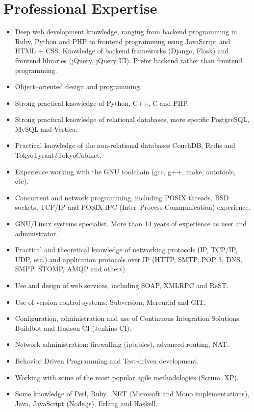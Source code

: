 \documentclass[a4paper,11pt]{moderncv}
\begin{document}
\section{Professional Expertise}
\begin{itemize}
\item Deep web development knowledge, ranging from backend programming in
  Ruby, Python and PHP to frontend programming using JavaScript and HTML + CSS.
  Knowledge of backend frameworks (Django, Flask) and frontend libraries
  (jQuery, jQuery UI). Prefer backend rather than frontend programming.
\item Object--oriented design and programming.
\item Strong practical knowledge of Python, C++, C and PHP.
\item Strong practical knowledge of relational databases, more specific
  PostgreSQL, MySQL and Vertica.
\item Practical knowledge of the non-relational databases CouchDB, Redis and
  TokyoTyrant/TokyoCabinet.
\item Experience working with the GNU toolchain (gcc, g++, make, autotools,
  etc).
\item Concurrent and network programming, including POSIX threads, BSD sockets,
  TCP/IP and POSIX IPC (Inter--Process Communication) experience.
\item GNU/Linux systems specialist. More than 14 years of experience as user
  and administrator.
\item Practical and theoretical knowledge of networking protocols (IP, TCP/IP,
  UDP, etc.) and application protocols over IP (HTTP, SMTP, POP 3, DNS, SMPP,
  STOMP, AMQP and others).
\item Use and design of web services, including SOAP, XMLRPC and ReST.
\item Use of version control systems: Subversion, Mercurial and GIT.
\item Configuration, administration and use of Continuous Integration
Solutions: Buildbot and Hudson CI (Jenkins CI).
\item Network administration: firewalling (iptables), advanced routing, NAT.
\item Behavior Driven Programming and Test-driven development.
\item Working with some of the most popular agile methodologies (Scrum, XP).
\item Some knowledge of Perl, Ruby, .NET (Microsoft and Mono implementations),
  Java, JavaScript (Node.js), Erlang and Haskell.
\end{itemize}
\end{document}
